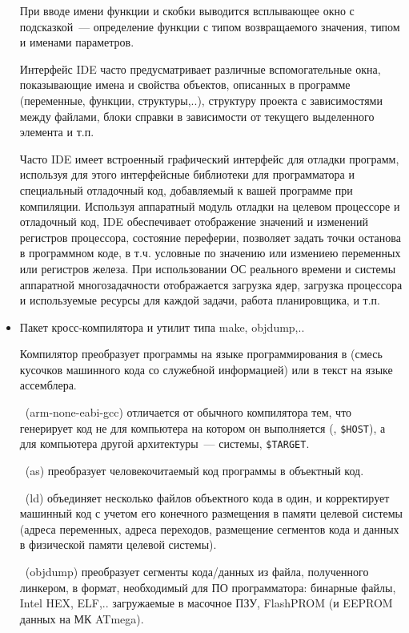\begin{itemize}
  При вводе имени функции и скобки выводится всплывающее окно с подсказкой\ ---
  определение функции с типом возвращаемого значения, типом и именами
  параметров.
  
  Интерфейс IDE часто предусматривает различные вспомогательные окна,
  показывающие имена и свойства объектов, описанных в программе (переменные,
  функции, структуры,..), структуру проекта с зависимостями между файлами, блоки
  справки в зависимости от текущего выделенного элемента и т.п.
  
  Часто IDE имеет встроенный графический интерфейс для отладки программ,
  используя для этого интерфейсные библиотеки для программатора и
  специальный отладочный код, добавляемый к вашей программе при
  компиляции. Используя аппаратный модуль отладки на целевом процессоре и
  отладочный код, IDE обеспечивает отображение значений и изменений регистров
  процессора, состояние переферии, позволяет задать точки останова в программном
  коде, в т.ч. условные по значению или измениею переменных или регистров
  железа.
  При использовании ОС реального времени и системы аппаратной многозадачности
  отображается загрузка ядер, загрузка процессора и используемые ресурсы для
  каждой задачи, работа планировщика, и т.п.
  
  \item Пакет кросс-компилятора и утилит типа make, objdump,..
  
  Компилятор преобразует программы на языке программирования в  (смесь кусочков машинного кода со служебной информацией) или в
  текст на языке ассемблера.
  
  \ (arm-none-eabi-gcc) отличается от обычного
  компилятора тем, что генерирует код не для компьютера на котором он выполняется
  (, \verb|$HOST|), а для компьютера другой
  архитектуры\ ---  системы, \verb|$TARGET|.
  
  \ (as) преобразует человекочитаемый код программы в объектный
  код.
  
  \ (ld) объединяет несколько файлов объектного кода в один,
  и корректирует машинный код с учетом его конечного размещения в памяти
  целевой системы (адреса переменных, адреса переходов, размещение сегментов
  кода и данных в физической памяти целевой системы).
  
  \ (objdump) преобразует сегменты кода/данных из файла,
  полученного линкером, в формат, необходимый для ПО программатора: бинарные файлы, Intel
  HEX, ELF,.. загружаемые в масочное ПЗУ, FlashPROM (и EEPROM данных на МК
  ATmega).
  

\end{itemize}
